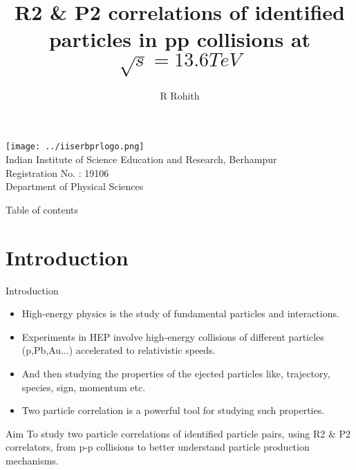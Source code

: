 \documentclass{beamer}
\title[R2 \& P2 of identified particles]{R2 \& P2 correlations of identified particles in pp collisions at $\sqrt{s}=13.6 TeV$}
\author{R Rohith}
\begin{document}
\begin{frame}
	\titlepage
	\centering
	\texttt{[image: ../iiserbprlogo.png]}\\
	{\tiny Indian Institute of Science Education and Research, Berhampur\\Registration No. : 19106\\Department of Physical Sciences\\}
\end{frame}
\begin{frame}{Table of contents}
	\tableofcontents
\end{frame}
\section{Introduction}
\begin{frame}{Introduction}
	\begin{itemize}
	\item High-energy physics is the study of fundamental particles and interactions.\\
	\item Experiments in HEP involve high-energy collisions of different particles (p,Pb,Au...) accelerated to relativistic speeds.\\
	\item And then studying the properties of the ejected particles like, trajectory, species, sign, momentum etc.
	\item Two particle correlation is a powerful tool for studying such properties.
	\end{itemize}
\end{frame}
\begin{frame}{Aim}
	To study two particle correlations of identified particle pairs, using R2 \& P2 correlators, from p-p collisions to better understand particle production mechanisms.
\end{frame}
\end{document}
